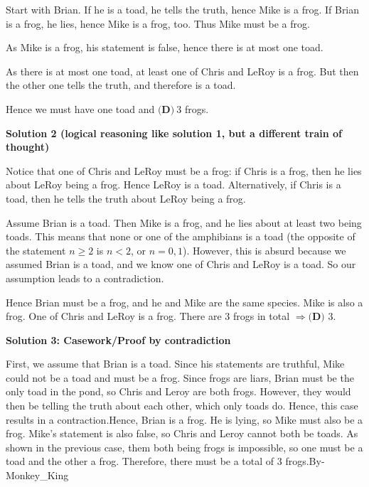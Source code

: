 \begin{enumerate}
Start with Brian. If he is a toad, he tells the truth, hence Mike is a frog. If Brian is a frog, he lies, hence Mike is a frog, too. Thus Mike must be a frog.

 As Mike is a frog, his statement is false, hence there is at most one toad.

 As there is at most one toad, at least one of Chris and LeRoy is a frog. But then the other one tells the truth, and therefore is a toad.

 Hence we must have one toad and $\boxed{\textbf{(D)}\ 3}$ frogs.

 



\textbf{Solution 2 (logical reasoning like solution 1, but a different train of thought)}

Notice that one of Chris and LeRoy must be a frog: if Chris is a frog, then he lies about LeRoy being a frog. Hence LeRoy is a toad. Alternatively, if Chris is a toad, then he tells the truth about LeRoy being a frog.

 Assume Brian is a toad. Then Mike is a frog, and he lies about at least two being toads. This means that none or one of the amphibians is a toad (the opposite of the statement $n\geq2$ is $n<2$, or $n=0, 1$). However, this is absurd because we assumed Brian is a toad, and we know one of Chris and LeRoy is a toad. So our assumption leads to a contradiction.

 Hence Brian must be a frog, and he and Mike are the same species. Mike is also a frog. One of Chris and LeRoy is a frog. There are $3$ frogs in total $\Longrightarrow \boxed{\textbf{(D) } 3}$.

 



\textbf{Solution 3: Casework/Proof by contradiction}

First, we assume that Brian is a toad. Since his statements are truthful, Mike could not be a toad and must be a frog. Since frogs are liars, Brian must be the only toad in the pond, so Chris and Leroy are both frogs. However, they would then be telling the truth about each other, which only toads do. Hence, this case results in a contraction.Hence, Brian is a frog. He is lying, so Mike must also be a frog. Mike's statement is also false, so Chris and Leroy cannot both be toads. As shown in the previous case, them both being frogs is impossible, so one must be a toad and the other a frog. Therefore, there must be a total of 3 frogs.By-Monkey\_King

 



\end{enumerate}
